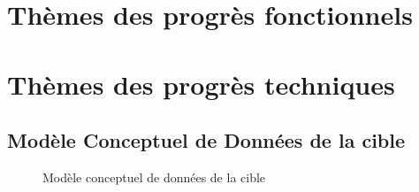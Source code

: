 

\newcommand{\mainTitle}{\'Etude préalable - SPIE}
\newcommand{\secondTitle}{Spécification du SI cible}
\newcommand{\documentRef}{DEB-SSIC/4401/1}





\tableofcontents
\listoffigures
\listoftables
\newpage

\part{Thèmes des progrès fonctionnels}
\setcounter{section}{0}


\part{Thèmes des progrès techniques}
\setcounter{section}{0}



\appendix
\chapter{Modèle Conceptuel de Données de la cible}

\begin{figure}[H]
    \label{fig-mcd-cible}
    \noindent{}
    \caption{Modèle conceptuel de données de la cible}
\end{figure}

